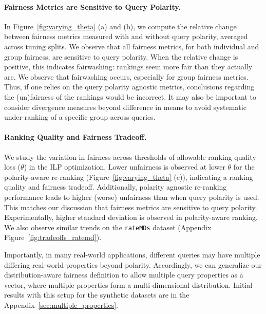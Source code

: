 \paragraph{Fairness Metrics are Sensitive to Query Polarity.}
\label{sec:query_polarity}
In Figure~\ref{fig:varying_theta} (a) and (b), we compute the relative change between fairness metrics measured with and without query polarity, averaged across tuning splits. We observe that all fairness metrics, for both individual and group fairness, are sensitive to query polarity. When the relative change is positive, this indicates fairwashing: rankings seem more fair than they actually are.
We observe that fairwashing occurs, especially for group fairness metrics. Thus, if one relies on the query polarity agnostic metrics, conclusions regarding the (un)fairness of the rankings would be incorrect. It may also be important to consider divergence measures beyond difference in means to avoid systematic under-ranking of a specific group across queries. 


\paragraph{Ranking Quality and Fairness Tradeoff.}
We study the variation in fairness across thresholds of allowable ranking quality loss ($\theta$) in the ILP optimization. Lower unfairness is observed at lower $\theta$ for the polarity-aware re-ranking  (Figure~\ref{fig:varying_theta} (c)), indicating a ranking quality and fairness tradeoff. Additionally, polarity agnostic re-ranking performance leads to higher (worse) unfairness than when query polarity is used. This matches our discussion that fairness metrics are sensitive to query polarity. Experimentally, higher standard deviation is observed in polarity-aware ranking. We also observe similar trends on the \texttt{rateMDs} dataset (Appendix Figure~\ref{fig:tradeoffs_ratemd}).

Importantly, in many real-world applications, different queries may have multiple differing real-world properties beyond polarity.
Accordingly, we can generalize our distribution-aware fairness definition to allow multiple query properties as a vector, where multiple properties form a multi-dimensional distribution. Initial results with this setup for the synthetic datasets are in the Appendix~\ref{sec:multiple_properties}.





